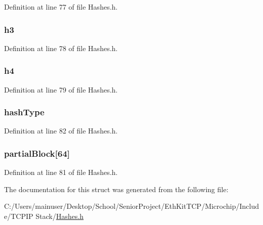 Definition at line 77 of file Hashes.\+h.

\hypertarget{struct_h_a_s_h___s_u_m_ac8d255567553c6b07b6dafe02a5e8366}{}
\subsubsection[{h3}]{ h3}\label{struct_h_a_s_h___s_u_m_ac8d255567553c6b07b6dafe02a5e8366}


Definition at line 78 of file Hashes.\+h.

\hypertarget{struct_h_a_s_h___s_u_m_a53c146819ec10d337664b8231e91b718}{}
\subsubsection[{h4}]{ h4}\label{struct_h_a_s_h___s_u_m_a53c146819ec10d337664b8231e91b718}


Definition at line 79 of file Hashes.\+h.

\hypertarget{struct_h_a_s_h___s_u_m_a29ccb4fbdf9c96cc30b969ab76c371e6}{}
\subsubsection[{hash\+Type}]{ hash\+Type}\label{struct_h_a_s_h___s_u_m_a29ccb4fbdf9c96cc30b969ab76c371e6}


Definition at line 82 of file Hashes.\+h.

\hypertarget{struct_h_a_s_h___s_u_m_a06e426199b6641cb74f1b9fda4493c0b}{}
\subsubsection[{partial\+Block}]{ partial\+Block\mbox{[}64\mbox{]}}\label{struct_h_a_s_h___s_u_m_a06e426199b6641cb74f1b9fda4493c0b}


Definition at line 81 of file Hashes.\+h.



The documentation for this struct was generated from the following file\+:\begin{DoxyCompactItemize}
\item 
C\+:/\+Users/mainuser/\+Desktop/\+School/\+Senior\+Project/\+Eth\+Kit\+T\+C\+P/\+Microchip/\+Include/\+T\+C\+P\+I\+P Stack/\hyperlink{_hashes_8h}{Hashes.\+h}\end{DoxyCompactItemize}
